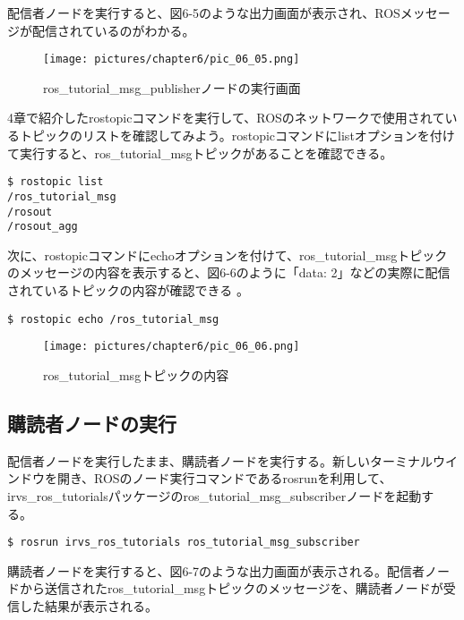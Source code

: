 配信者ノードを実行すると、図6-5のような出力画面が表示され、ROSメッセージが配信されているのがわかる。

\begin{figure}[h]
  \centering
  \texttt{[image: pictures/chapter6/pic\_06\_05.png]}
  \caption{ros\_tutorial\_msg\_publisherノードの実行画面}
\end{figure}

4章で紹介したrostopicコマンドを実行して、ROSのネットワークで使用されているトピックのリストを確認してみよう。rostopicコマンドにlistオプションを付けて実行すると、ros\_tutorial\_msgトピックがあることを確認できる。

\begin{lstlisting}[language=ROS]
$ rostopic list
/ros_tutorial_msg
/rosout
/rosout_agg
\end{lstlisting}

次に、rostopicコマンドにechoオプションを付けて、ros\_tutorial\_msgトピックのメッセージの内容を表示すると、図6-6のように「data: 2」などの実際に配信されているトピックの内容が確認できる  。

\begin{lstlisting}[language=ROS]
$ rostopic echo /ros_tutorial_msg
\end{lstlisting}

\begin{figure}[h]
  \centering
  \texttt{[image: pictures/chapter6/pic\_06\_06.png]}
  \caption{ros\_tutorial\_msgトピックの内容}
\end{figure}

\subsection{購読者ノードの実行}

配信者ノードを実行したまま、購読者ノードを実行する。新しいターミナルウインドウを開き、ROSのノード実行コマンドであるrosrunを利用して、irvs\_ros\_tutorialsパッケージのros\_tutorial\_msg\_subscriberノードを起動する。

\begin{lstlisting}[language=ROS]
$ rosrun irvs_ros_tutorials ros_tutorial_msg_subscriber
\end{lstlisting}

購読者ノードを実行すると、図6-7のような出力画面が表示される。配信者ノードから送信されたros\_tutorial\_msgトピックのメッセージを、購読者ノードが受信した結果が表示される。

